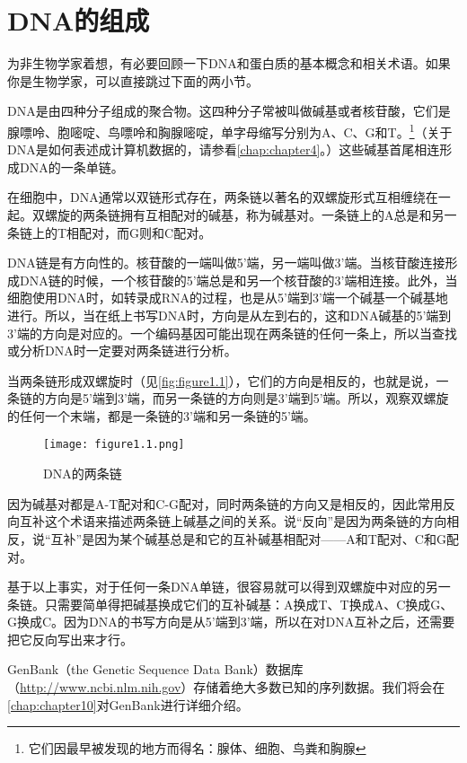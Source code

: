 \section{DNA的组成}
为非生物学家着想，有必要回顾一下DNA和蛋白质的基本概念和相关术语。如果你是生物学家，可以直接跳过下面的两小节。

DNA是由四种分子组成的聚合物。这四种分子常被叫做碱基或者核苷酸，它们是腺嘌呤、胞嘧啶、鸟嘌呤和胸腺嘧啶，单字母缩写分别为A、C、G和T。\footnote{它们因最早被发现的地方而得名：腺体、细胞、鸟粪和胸腺}（关于DNA是如何表述成计算机数据的，请参看\autoref{chap:chapter4}。）这些碱基首尾相连形成DNA的一条单链。

在细胞中，DNA通常以双链形式存在，两条链以著名的双螺旋形式互相缠绕在一起。双螺旋的两条链拥有互相配对的碱基，称为碱基对。一条链上的A总是和另一条链上的T相配对，而G则和C配对。

DNA链是有方向性的。核苷酸的一端叫做5'端，另一端叫做3'端。当核苷酸连接形成DNA链的时候，一个核苷酸的5'端总是和另一个核苷酸的3'端相连接。此外，当细胞使用DNA时，如转录成RNA的过程，也是从5'端到3'端一个碱基一个碱基地进行。所以，当在纸上书写DNA时，方向是从左到右的，这和DNA碱基的5'端到3'端的方向是对应的。一个编码基因可能出现在两条链的任何一条上，所以当查找或分析DNA时一定要对两条链进行分析。

当两条链形成双螺旋时（见\autoref{fig:figure1.1}），它们的方向是相反的，也就是说，一条链的方向是5'端到3'端，而另一条链的方向则是3'端到5'端。所以，观察双螺旋的任何一个末端，都是一条链的3'端和另一条链的5'端。

\begin{figure}
  \centering
  \texttt{[image: figure1.1.png]}
  \caption{DNA的两条链}
  \label{fig:figure1.1}
\end{figure}

因为碱基对都是A-T配对和C-G配对，同时两条链的方向又是相反的，因此常用反向互补这个术语来描述两条链上碱基之间的关系。说“反向”是因为两条链的方向相反，说“互补”是因为某个碱基总是和它的互补碱基相配对——A和T配对、C和G配对。

基于以上事实，对于任何一条DNA单链，很容易就可以得到双螺旋中对应的另一条链。只需要简单得把碱基换成它们的互补碱基：A换成T、T换成A、C换成G、G换成C。因为DNA的书写方向是从5'端到3'端，所以在对DNA互补之后，还需要把它反向写出来才行。

GenBank（the Genetic Sequence Data
Bank）数据库（\href{http://www.ncbi.nlm.nih.gov}{http://www.ncbi.nlm.nih.gov}）存储着绝大多数已知的序列数据。我们将会在\autoref{chap:chapter10}对GenBank进行详细介绍。

